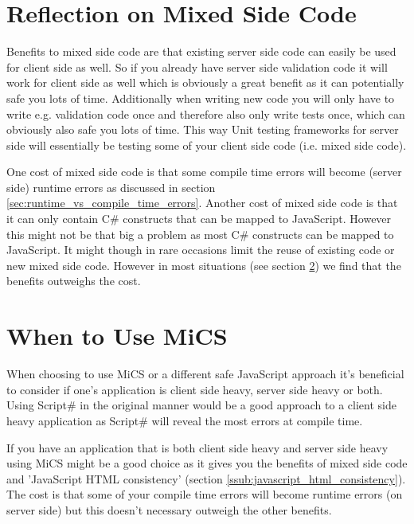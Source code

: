 
\section{Reflection on Mixed Side Code} %
\label{sec:reflection_on_mixed_side_code}
	Benefits to mixed side code are that existing server side code can easily be used for client side as well. So if you already have server side validation code it will work for client side as well which is obviously a great benefit as it can potentially safe you lots of time. Additionally when writing new code you will only have to write e.g. validation code once and therefore also only write tests once, which can obviously also safe you lots of time. This way Unit testing frameworks for server side will essentially be testing some of your client side code (i.e. mixed side code).

	One cost of mixed side code is that some compile time errors will become (server side) runtime errors as discussed in section \ref{sec:runtime_vs_compile_time_errors}. Another cost of mixed side code is that it can only contain C\# constructs that can be mapped to JavaScript. However this might not be that big a problem as most C\# constructs can be mapped to JavaScript. It might though in rare occasions limit the reuse of existing code or new mixed side code. However in most situations (see section \ref{sec:when_to_use_mics}) we find that the benefits outweighs the cost.


\section{When to Use MiCS} %
\label{sec:when_to_use_mics}
	When choosing to use MiCS or a different safe JavaScript approach it’s beneficial to consider if one’s application is client side heavy, server side heavy or both. Using Script\# in the original manner would be a good approach to a client side heavy application as Script\# will reveal the most errors at compile time. 

	If you have an application that is both client side heavy and server side heavy using MiCS might be a good choice as it gives you the benefits of mixed side code and 'JavaScript HTML consistency' (section \ref{ssub:javascript_html_consistency}). The cost is that some of your compile time errors will become runtime errors (on server side) but this doesn’t necessary outweigh the other benefits. 


